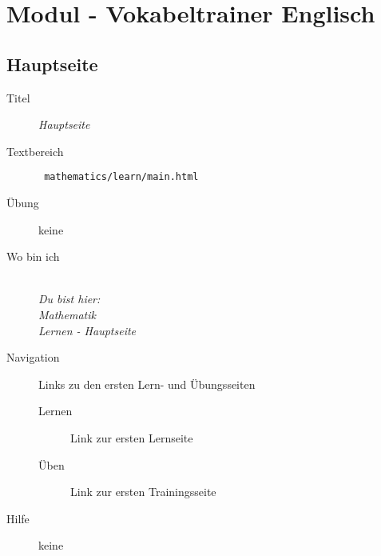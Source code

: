 \chapter{Modul - Vokabeltrainer Englisch}
\label{has:voc-module}

\section{ Hauptseite }
\label{has:voc-module-mainpage}
\begin{description}
  \item[Titel] \emph{ Hauptseite }
  \item[Textbereich] \texttt{ mathematics/learn/main.html }
  \item[Übung] keine
  \item[Wo bin ich] \emph{\\Du bist hier:\\Mathematik\\Lernen - Hauptseite}
  \item[Navigation] Links zu den ersten Lern- und Übungsseiten
  \begin{description}
    \item[Lernen] Link zur ersten Lernseite 
    \item[Üben] Link zur ersten Trainingsseite 
  \end{description}
  \item[Hilfe] keine
\end{description}

